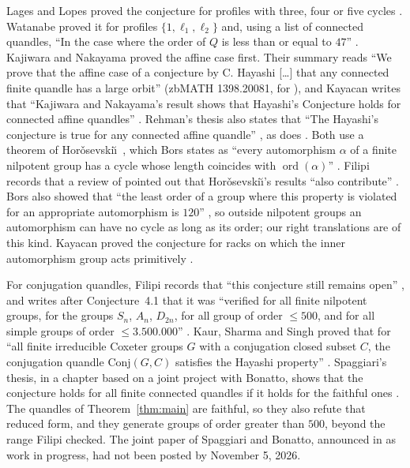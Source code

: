 \documentclass[11pt]{article}
\begin{document}
Lages and Lopes proved the conjecture for profiles with three, four or
five cycles \cite[Theorem~1.7]{LL}.
Watanabe proved it for profiles $\{1,\ell_1,\ell_2\}$
\cite[Proposition~2.2]{W} and, using a list of connected quandles,
``In the case where the order of $Q$ is less than or equal to $47$''
\cite[Proposition~3.1]{W}. Kajiwara and Nakayama proved the affine case
first. Their summary reads ``We prove that the affine case of a conjecture
by C. Hayashi [\dots] that any connected finite quandle has a large orbit''
(zbMATH 1398.20081, for \cite{KN}), and Kayacan writes that ``Kajiwara and
Nakayama's result shows that Hayashi's Conjecture holds for connected
affine quandles'' \cite[\S1]{K}. Rehman's thesis also states that ``The
Hayashi's conjecture is true for any connected affine quandle''
\cite[Observations~1.4.7(4)]{Rt}, as does \cite[\S4, the second Case~4]{R}.
Both use a theorem of Hor\v{o}sevski\u{\i}~\cite{Ho}, which Bors states as
``every automorphism $\alpha$ of a finite nilpotent group has a cycle whose
length coincides with $\operatorname{ord}(\alpha)$'' \cite[Abstract]{B}.
Filipi records that a review of \cite{KN} pointed out that
Hor\v{o}sevski\u{\i}'s results ``also contribute'' \cite[\S1]{F}. Bors also
showed that ``the least order of a group where this property is violated
for an appropriate automorphism is $120$'' \cite[Abstract]{B}, so outside
nilpotent groups an automorphism can have no cycle as long as its order;
our right translations are of this kind. Kayacan proved the conjecture for
racks on which the inner automorphism group acts primitively
\cite[Theorem~6]{K}.

For conjugation quandles, Filipi records that ``this conjecture still
remains open'' \cite[\S1]{F}, and writes after Conjecture~4.1 that it was
``verified for all finite nilpotent groups, for the groups $S_n$, $A_n$,
$D_{2n}$, for all group of order $\le500$, and for all simple groups of
order $\le3.500.000$'' \cite[\S4]{F}. Kaur, Sharma and Singh proved that
for ``all finite irreducible Coxeter groups $G$ with a conjugation closed
subset $C$, the conjugation quandle $\mathrm{Conj}(G,C)$ satisfies the
Hayashi property'' \cite[Abstract]{KSS}. Spaggiari's thesis, in a chapter
based on a joint project with Bonatto, shows that the conjecture holds for
all finite connected quandles if it holds for the faithful ones
\cite[Theorem~6.4.1]{S}. The quandles of Theorem~\ref{thm:main} are
faithful, so they also refute that reduced form, and they generate groups
of order greater than $500$, beyond the range Filipi checked. The joint
paper of Spaggiari and Bonatto, announced in \cite{S} as work in progress,
had not been posted by November 5, 2026.
\end{document}
